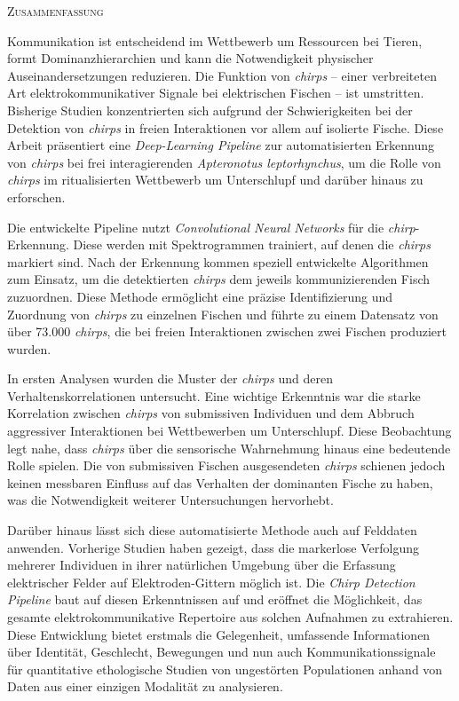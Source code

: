 \newpage

\begin{center}
  \textsc{Zusammenfassung}
\end{center}

\noindent

Kommunikation ist entscheidend im Wettbewerb um Ressourcen bei
Tieren, formt Dominanzhierarchien und kann die Notwendigkeit physischer
Auseinandersetzungen reduzieren. Die Funktion von \emph{chirps} – einer verbreiteten
Art elektrokommunikativer Signale bei elektrischen Fischen – ist 
umstritten. Bisherige Studien konzentrierten sich aufgrund der Schwierigkeiten
bei der Detektion von \emph{chirps} in freien Interaktionen vor allem auf isolierte
Fische. Diese Arbeit präsentiert eine \emph{Deep-Learning Pipeline} zur
automatisierten Erkennung von \emph{chirps} bei frei interagierenden
\textit{Apteronotus leptorhynchus}, um die Rolle von \emph{chirps} im ritualisierten
Wettbewerb um Unterschlupf und darüber hinaus zu erforschen.

Die entwickelte Pipeline nutzt \emph{Convolutional Neural Networks} für die
\emph{chirp}-Erkennung. Diese werden mit Spektrogrammen trainiert, auf denen
die \emph{chirps} markiert sind. Nach der Erkennung kommen speziell entwickelte
Algorithmen zum Einsatz, um die detektierten \emph{chirps} dem jeweils
kommunizierenden Fisch zuzuordnen. Diese Methode ermöglicht eine präzise
Identifizierung und Zuordnung von \emph{chirps} zu einzelnen Fischen und führte
zu einem Datensatz von über 73.000 \emph{chirps}, die bei freien Interaktionen
zwischen zwei Fischen produziert wurden.

In ersten Analysen wurden die Muster der \emph{chirps} und deren
Verhaltenskorrelationen untersucht. Eine wichtige Erkenntnis war die starke
Korrelation zwischen \emph{chirps} von submissiven Individuen und dem Abbruch
aggressiver Interaktionen bei Wettbewerben um Unterschlupf. Diese Beobachtung
legt nahe, dass \emph{chirps} über die sensorische Wahrnehmung hinaus eine
bedeutende Rolle spielen. Die von submissiven Fischen ausgesendeten
\emph{chirps} schienen jedoch keinen messbaren Einfluss auf das Verhalten der
dominanten Fische zu haben, was die Notwendigkeit weiterer Untersuchungen
hervorhebt.

Darüber hinaus lässt sich diese automatisierte Methode auch auf Felddaten
anwenden. Vorherige Studien haben gezeigt, dass die markerlose Verfolgung
mehrerer Individuen in ihrer natürlichen Umgebung über die Erfassung
elektrischer Felder auf Elektroden-Gittern möglich ist. Die \emph{Chirp
Detection Pipeline} baut auf diesen Erkenntnissen auf und eröffnet die
Möglichkeit, das gesamte elektrokommunikative Repertoire aus solchen Aufnahmen
zu extrahieren. Diese Entwicklung bietet erstmals die Gelegenheit, umfassende
Informationen über Identität, Geschlecht, Bewegungen und nun auch
Kommunikationssignale für quantitative ethologische Studien von ungestörten
Populationen anhand von Daten aus einer einzigen Modalität zu analysieren.

